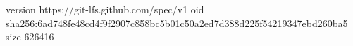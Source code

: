 version https://git-lfs.github.com/spec/v1
oid sha256:6ad748fe48cd4f9f2907c858bc5b01c50a2ed7d388d225f54219347ebd260ba5
size 626416
